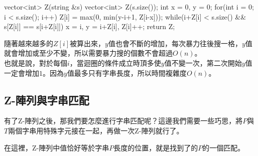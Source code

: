 \documentclass[main.tex]{subfiles}
\begin{document}
\begin{C++}
vector<int> Z(string &s){
    vector<int> Z(s.size());
    int x = 0, y = 0;
    for(int i = 0; i < s.size(); i++){
        Z[i] = max(0, min(y-i+1, Z[i-x]));
        while(i+Z[i] < s.size() && s[Z[i]] == s[i+Z[i]])
            x = i, y = i+Z[i], Z[i]++;
    }
    return Z;
}
\end{C++}

隨著越來越多的$Z[i]$被算出來，$y$值也會不斷的增加，每次暴力往後搜一格，$y$值就會增加或至少不變，所以需要暴力搜的個數不會超過$O(n)$。\\

也就是說，對於每個$i$，當迴圈的條件成立時頂多使$y$值不變一次，第二次開始$y$值一定會增加$1$。因為$y$值最多只有字串長度，所以時間複雜度$O(n)$。

\subsection{Z-陣列與字串匹配}

有了Z-陣列之後，那我們要怎麼進行字串匹配呢？這邊我們需要一些巧思，將$P$與$T$兩個字串用特殊字元接在一起，再做一次Z-陣列就行了。

\begin{center}
\end{center}

在這裡，Z-陣列中值恰好等於字串$P$長度的位置，就是找到了的$P$的一個匹配。
\end{document}
